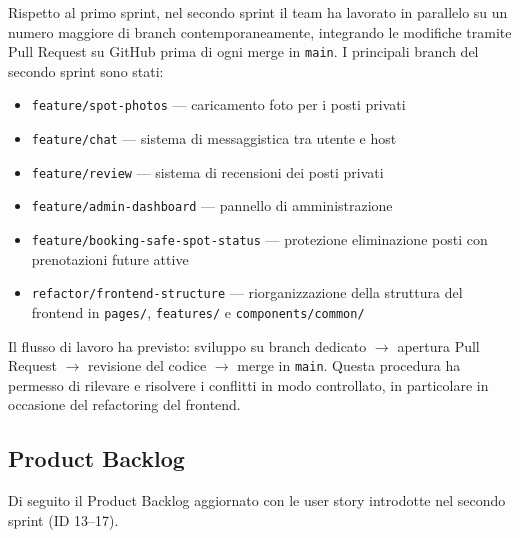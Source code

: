 \documentclass[a4paper,12pt]{article}
\begin{document}
Rispetto al primo sprint, nel secondo sprint il team ha lavorato in parallelo su un
numero maggiore di branch contemporaneamente, integrando le modifiche tramite Pull
Request su GitHub prima di ogni merge in \texttt{main}.
I principali branch del secondo sprint sono stati:

\begin{itemize}
  \item \texttt{feature/spot-photos} --- caricamento foto per i posti privati
  \item \texttt{feature/chat} --- sistema di messaggistica tra utente e host
  \item \texttt{feature/review} --- sistema di recensioni dei posti privati
  \item \texttt{feature/admin-dashboard} --- pannello di amministrazione
  \item \texttt{feature/booking-safe-spot-status} --- protezione eliminazione posti con
        prenotazioni future attive
  \item \texttt{refactor/frontend-structure} --- riorganizzazione della struttura del
        frontend in \texttt{pages/}, \texttt{features/} e \texttt{components/common/}
\end{itemize}

Il flusso di lavoro ha previsto: sviluppo su branch dedicato $\rightarrow$ apertura
Pull Request $\rightarrow$ revisione del codice $\rightarrow$ merge in \texttt{main}.
Questa procedura ha permesso di rilevare e risolvere i conflitti in modo controllato,
in particolare in occasione del refactoring del frontend.

\subsection{Product Backlog}

Di seguito il Product Backlog aggiornato con le user story introdotte nel secondo
sprint (ID 13--17).
\end{document}
